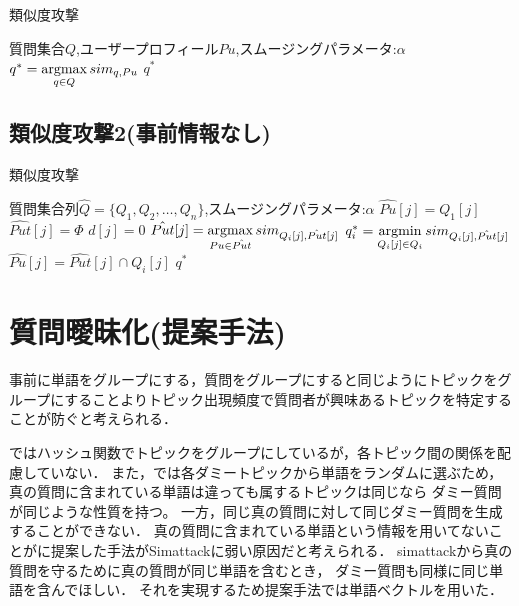 \documentclass[master]{suribt}
\theoremstyle{definition}
\newcommand{\argmax}{\mathop{\rm argmax}\limits}
\newcommand{\argmin}{\mathop{\rm argmin}\limits}
\begin{document}
 \begin{algorithm}
 \caption{類似度攻撃}
 \begin{algorithmic}[1]
   \Require 質問集合$Q$,ユーザープロフィール$Pu$,スムージングパラメータ:$\alpha$
   \State $q^* = \argmax_{q \in Q}sim_{q,Pu}$
   \Ensure $q^*$
 \end{algorithmic}
 \end{algorithm}

 \section{類似度攻撃2(事前情報なし)}

 \begin{algorithm}
 \caption{類似度攻撃}
 \begin{algorithmic}[1]
  \Require 質問集合列$\hat{Q}=\{ Q_1,Q_2, \dots , Q_n\}$,スムージングパラメータ:$\alpha$
   \State $\hat{Pu}[j] = Q_1[j]$
   \State $\hat{Put}[j] = \Phi$
   \State $d[j] = 0$
  \EndFor
   \State $\hat{Put}[j] = \argmax_{Pu \in \hat{Put}}sim_{Q_i[j],\hat{Put}[j]}$
   \EndFor
   \State $q^*_i = \argmin_{Q_i[j] \in Q_i}sim_{Q_i[j],\hat{Put}[j]}$
    \State $\hat{Pu}[j] = \hat{Put}[j] \cap Q_i[j]$
   \EndFor
  \EndFor
  \Ensure $q^*$
 \end{algorithmic}
 \end{algorithm}
 
 \chapter{質問曖昧化(提案手法)}
 事前に単語をグループにする\cite{embellishing2010}，質問をグループにする\cite{providing2009}と同じようにトピックをグループにすることよりトピック出現頻度で質問者が興味あるトピックを特定することが防ぐと考えられる．
 
 \cite{masking2014}ではハッシュ関数でトピックをグループにしているが，各トピック間の関係を配慮していない．
 また，\cite{masking2014}では各ダミートピックから単語をランダムに選ぶため，
 真の質問に含まれている単語は違っても属するトピックは同じなら
 ダミー質問が同じような性質を持つ。
 一方，同じ真の質問に対して同じダミー質問を生成することができない．
 真の質問に含まれている単語という情報を用いてないことが\cite{masking2014}に提案した手法がSimattackに弱い原因だと考えられる．
 simattackから真の質問を守るために真の質問が同じ単語を含むとき，
 ダミー質問も同様に同じ単語を含んでほしい．
 それを実現するため提案手法では単語ベクトルを用いた．
 
\end{document}
